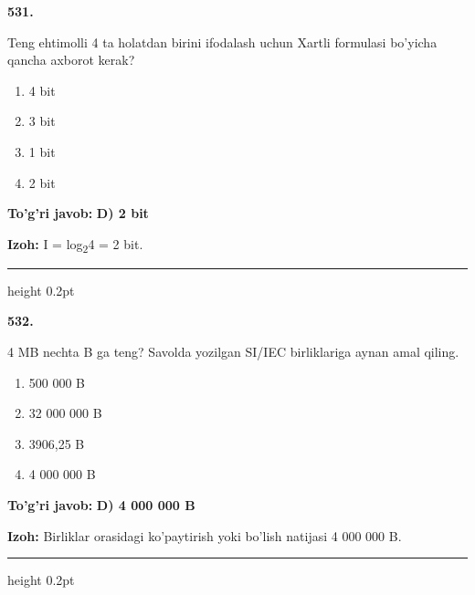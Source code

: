 \documentclass[10pt,a4paper,oneside]{article}
\begin{document}
\noindent\textbf{\color{ink}531.}
\par
Teng ehtimolli 4 ta holatdan birini ifodalash uchun Xartli formulasi bo'yicha qancha axborot kerak?
\begin{enumerate}[label=\Alph*),leftmargin=9mm]
\item 4 bit
\item 3 bit
\item 1 bit
\item 2 bit
\end{enumerate}
\begin{tcolorbox}[enhanced,breakable,colback=teal!4,colframe=teal!50!black,boxrule=0.5pt,arc=1.1mm,left=3mm,right=3mm,top=1.7mm,bottom=1.7mm,before skip=2mm,after skip=2mm]
\textbf{\color{teal}To'g'ri javob:} \textbf{D) 2 bit}
\par\smallskip
\textbf{Izoh:} I = log\textsubscript{2}4 = 2 bit.
\end{tcolorbox}
\vspace{2mm}\hrule height 0.2pt \vspace{3mm}

\noindent\textbf{\color{ink}532.}
\par
4 MB nechta B ga teng? Savolda yozilgan SI/IEC birliklariga aynan amal qiling.
\begin{enumerate}[label=\Alph*),leftmargin=9mm]
\item 500 000 B
\item 32 000 000 B
\item 3906,25 B
\item 4 000 000 B
\end{enumerate}
\begin{tcolorbox}[enhanced,breakable,colback=teal!4,colframe=teal!50!black,boxrule=0.5pt,arc=1.1mm,left=3mm,right=3mm,top=1.7mm,bottom=1.7mm,before skip=2mm,after skip=2mm]
\textbf{\color{teal}To'g'ri javob:} \textbf{D) 4 000 000 B}
\par\smallskip
\textbf{Izoh:} Birliklar orasidagi ko'paytirish yoki bo'lish natijasi 4 000 000 B.
\end{tcolorbox}
\vspace{2mm}\hrule height 0.2pt \vspace{3mm}
\end{document}
